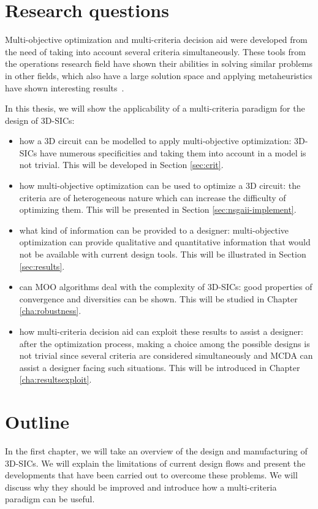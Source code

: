 \section*{Research questions}
Multi-objective optimization and multi-criteria decision aid were developed from the need of taking into account several criteria simultaneously. These tools from the operations research field have shown their abilities in solving similar problems in other fields, which also have a large solution space and applying metaheuristics have shown interesting results~\cite{talbi09}.

In this thesis, we will show the applicability of a multi-criteria paradigm for the design of 3D-SICs:
\begin{itemize}
\item how a 3D circuit can be modelled to apply multi-objective optimization: 3D-SICs have numerous specificities and taking them into account in a model is not trivial. This will be developed in Section \ref{sec:crit}.
\item how multi-objective optimization can be used to optimize a 3D circuit: the criteria are of heterogeneous nature which can increase the difficulty of optimizing them. This will be presented in Section \ref{sec:nsgaii-implement}.
\item what kind of information can be provided to a designer: multi-objective optimization can provide qualitative and quantitative information that would not be available with current design tools. This will be illustrated in Section \ref{sec:results}.
\item can MOO algorithms deal with the complexity of 3D-SICs: good properties of convergence and diversities can be shown. This will be studied in Chapter \ref{cha:robustness}.
\item how multi-criteria decision aid can exploit these results to assist a designer: after the optimization process, making a choice among the possible designs is not trivial since several criteria are considered simultaneously and MCDA can assist a designer facing such situations. This will be introduced in Chapter \ref{cha:resultsexploit}.
\end{itemize}

\section*{Outline}
In the first chapter, we will take an overview of the design and manufacturing of 3D-SICs. We will explain the limitations of current design flows and present the developments that have been carried out to overcome these problems. We will discuss why they should be improved and introduce how a multi-criteria paradigm can be useful.

